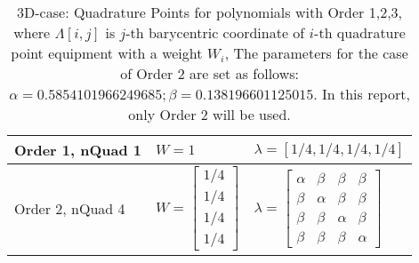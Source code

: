 \begin{table}[ht]
  \centering
  \caption{3D-case: Quadrature Points for polynomials with Order 1,2,3,
  where $\Lambda[i,j]$ is $j$-th barycentric coordinate of $i$-th quadrature point equipment with a weight $W_i$,
  The parameters for the case of Order 2 are set as follows:$\alpha = 0.5854101966249685; \beta = 0.138196601125015 $.
  In this report, only Order 2 will be used.}
  \label{tab:quadrature-points-3d}
  \begin{tabular}{l|l|l}
    \hline
    Order 1, nQuad 1
    & $W = 1$
    & $\lambda = [1/4, 1/4, 1/4, 1/4]$ \\
    \hline
    Order 2, nQuad 4
    & $W=\left[
      \begin{array}{c}
        1/4 \\
        1/4 \\
        1/4 \\ 
        1/4
      \end{array}\right]$
    &$\lambda=\left[\begin{array}{cccc}
      \alpha & \beta  & \beta  & \beta \\
       \beta  & \alpha & \beta  & \beta \\
       \beta  & \beta  & \alpha & \beta \\
       \beta  & \beta  & \beta  & \alpha 
    \end{array}\right]$ \\
     \hline
  \end{tabular}
\end{table}

